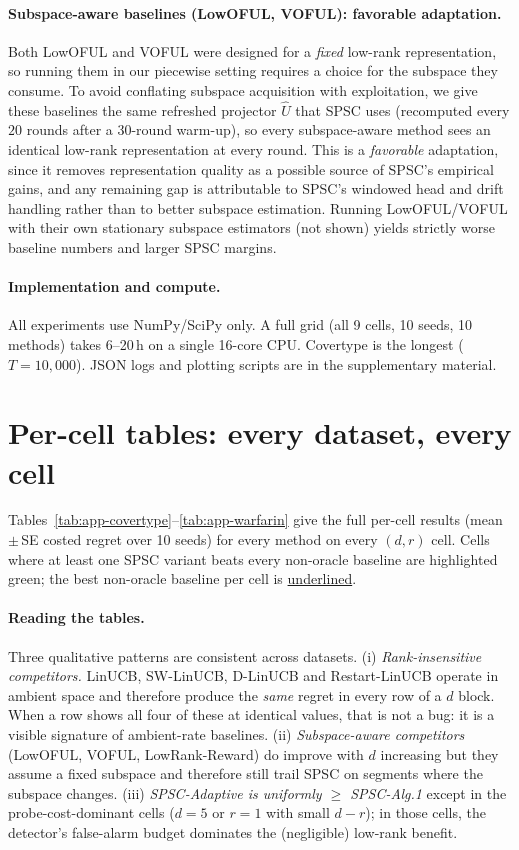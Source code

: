 \documentclass{article}
\begin{document}
\paragraph{Subspace-aware baselines (LowOFUL, VOFUL): favorable adaptation.}
Both LowOFUL and VOFUL were designed for a \emph{fixed} low-rank
representation, so running them in our piecewise setting requires a
choice for the subspace they consume. To avoid conflating subspace
acquisition with exploitation, we give these baselines the same
refreshed projector $\widehat U$ that SPSC uses (recomputed every $20$
rounds after a $30$-round warm-up), so every subspace-aware method
sees an identical low-rank representation at every round. This is a
\emph{favorable} adaptation, since it removes representation quality as a
possible source of SPSC's empirical gains, and any remaining gap is
attributable to SPSC's windowed head and drift handling rather than to
better subspace estimation. Running LowOFUL/VOFUL with their own
stationary subspace estimators (not shown) yields strictly worse
baseline numbers and larger SPSC margins.

\paragraph{Implementation and compute.}
All experiments use NumPy/SciPy only. A full grid (all 9 cells, 10
seeds, 10 methods) takes 6--20\,h on a single 16-core CPU. Covertype
is the longest ($T=10{,}000$). JSON logs and plotting scripts are in
the supplementary material.

\section{Per-cell tables: every dataset, every cell}
\label{app:percell}

Tables~\ref{tab:app-covertype}--\ref{tab:app-warfarin} give the full
per-cell results (mean\,$\pm$\,SE costed regret over 10 seeds) for
every method on every $(d,r)$ cell. Cells where at least one SPSC
variant beats every non-oracle baseline are highlighted
\colorbox{green!12}{green}; the best non-oracle baseline per cell is
\underline{underlined}.



\paragraph{Reading the tables.}
Three qualitative patterns are consistent across datasets.
(i) \emph{Rank-insensitive competitors.} LinUCB, SW-LinUCB, D-LinUCB
and Restart-LinUCB operate in ambient space and therefore produce the
\emph{same} regret in every row of a $d$ block. When a row shows all
four of these at identical values, that is not a bug: it is a visible
signature of ambient-rate baselines.
(ii) \emph{Subspace-aware competitors} (LowOFUL, VOFUL, LowRank-Reward)
do improve with $d$ increasing but they assume a fixed subspace and
therefore still trail SPSC on segments where the subspace changes.
(iii) \emph{SPSC-Adaptive is uniformly $\ge$ SPSC-Alg.1} except in the
probe-cost-dominant cells ($d{=}5$ or $r{=}1$ with small $d-r$); in
those cells, the detector's false-alarm budget dominates the
(negligible) low-rank benefit.
\end{document}
